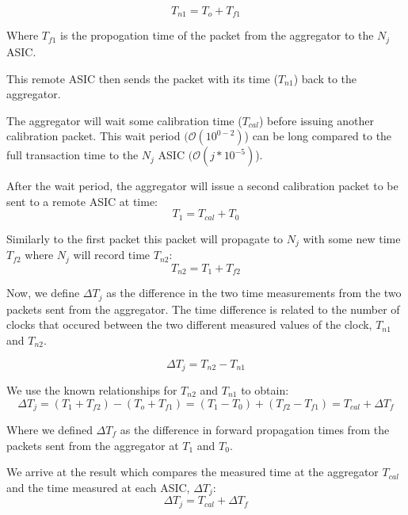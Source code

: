 \begin{equation}
  T_{n1} = T_{o} + T_{f1}
\end{equation}

Where $T_{f1}$ is the propogation time of the packet from the aggregator to the $N_{j}$ ASIC.

This remote ASIC then sends the packet with its time ($T_{n1}$) back to the aggregator.

The aggregator will wait some calibration time ($T_{cal}$) before issuing another calibration packet.
This wait period $(\mathcal{O}(10^{0-2})$) can be long compared to the full transaction time to the $N_{j}$ ASIC $(\mathcal{O}(j*10^{-5})$).

After the wait period, the aggregator will issue a second calibration packet to be sent to a remote ASIC at time:
\begin{equation}
  T_{1} = T_{cal} + T_{0}
\end{equation}

Similarly to the first packet this packet will propagate to $N_{j}$ with some new time $T_{f2}$ where $N_{j}$ will record time $T_{n2}$:
\begin{equation}
  T_{n2} = T_{1} + T_{f2}
\end{equation}

Now, we define $\Delta T_{j}$ as the difference in the two time measurements from the two packets sent from the aggregator.
The time difference is related to the number of clocks that occured between the two different measured values of the clock, $T_{n1}$ and $T_{n2}$.

\begin{equation}
  \Delta T_{j} = T_{n2} - T_{n1}
\end{equation}

We use the known relationships for $T_{n2}$ and $T_{n1}$ to obtain:
\begin{equation}
  \Delta T_{j} = (T_{1} + T_{f2}) - (T_{o} + T_{f1}) = (T_{1} - T_{0}) + (T_{f2} - T_{f1}) = T_{cal} + \Delta T_{f}
\end{equation}

Where we defined $\Delta T_{f}$ as the difference in forward propagation times from the packets sent from the aggregator at $T_{1}$ and $T_{0}$.

We arrive at the result which compares the measured time at the aggregator $T_{cal}$ and the time measured at each ASIC, $\Delta T_{j}$:
\begin{equation}
  \Delta T_{j} = T_{cal} + \Delta T_{f}
\end{equation}

